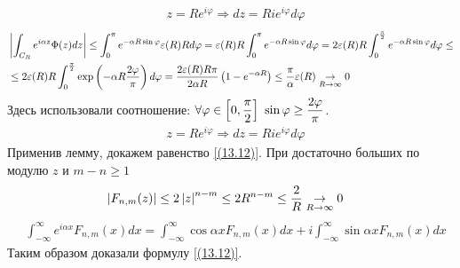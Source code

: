 \begin{align*}
  & z = R e^{i \varphi} \Rightarrow dz = R i e^{i \varphi} d \varphi
\end{align*}
\begin{align*}
  & \left| \int_{C_R}e^{i \alpha z}\Phi(z) dz \right| \leq \int_{0}^{\pi}e^{-\alpha R \sin \varphi}\varepsilon(R) R d \varphi = \varepsilon(R) R \int_{0}^{\pi}e^{-\alpha R \sin \varphi}d \varphi = 2 \varepsilon(R) R \int_{0}^{\frac{\pi}{2}}e^{-\alpha R \sin \varphi}d \varphi \leq \\
  & \leq 2 \varepsilon(R) R \int_{0}^{\frac{\pi}{2}}\exp\left( -\alpha R \frac{2 \varphi}{\pi} \right) d \varphi = \frac{2 \varepsilon(R) R \pi}{2 \alpha R}\left( 1 - e^{-\alpha R} \right) \leq \frac{\pi}{\alpha} \varepsilon(R) \underset{R \to \infty}{\to} 0
\end{align*}
Здесь использовали соотношение: $\forall \varphi \in \left[ 0, \displaystyle
    \frac{\pi}{2} \right] \ \sin \varphi \geq \displaystyle \frac{2 \varphi}{\pi}$.
\begin{align*}
  & z = R e^{i \varphi} \Rightarrow dz = R i e^{i \varphi} d \varphi
\end{align*}
Применив лемму, докажем равенство \eqref{(13.12)}. При достаточно больших по
модулю $z$ и $m-n \geq 1$
\begin{align*}
  & \left| F_{n,m}(z) \right| \leq 2 \left| z \right|^{n-m} \leq 2 R^{n-m} \leq \frac{2}{R} \underset{R \to \infty}{\to} 0
\end{align*}
\begin{align*}
  & \int_{-\infty}^\infty e^{i \alpha x}F_{n,m}(x) dx = \int_{-\infty}^\infty \cos\alpha xF_{n,m}(x) dx + i \int_{-\infty}^\infty \sin \alpha x F_{n,m}(x) dx
\end{align*}
Таким образом доказали формулу \eqref{(13.12)}.
